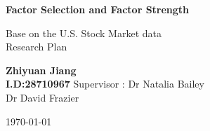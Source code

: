 \begin{titlepage}
\begin{center}
\vspace*{1cm}
\Huge
\textbf{Factor Selection and Factor Strength}

\vspace{0.5cm}
\LARGE
Base on the U.S. Stock Market data\\
Research Plan 

\vspace{1.5 cm}
\textbf{Zhiyuan Jiang\\I.D:28710967}
\vfill
 Supervisor : Dr Natalia Bailey\\\hspace{36mm} Dr David Frazier
 \vspace{0.8cm}
 
\Large
\today
\end{center}
\end{titlepage}